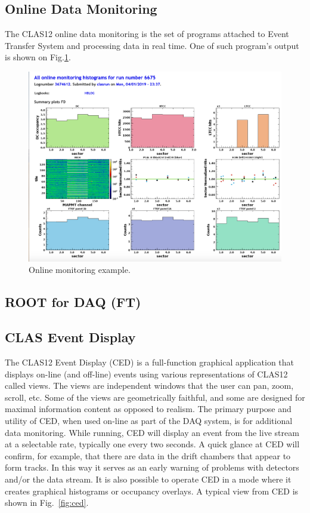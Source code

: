 \subsection{Online Data Monitoring}

The CLAS12 online data monitoring is the set of programs attached to Event Transfer System and processing data in real time. One of such program's output is shown on Fig.\ref{fig:online_monitor}.

\begin{figure}[hbt]
	\centering
	\includegraphics[width=1.0\columnwidth,keepaspectratio]{img/online_monitor.png}
	\caption{Online monitoring example.}
	\label{fig:online_monitor}
\end{figure}

\subsection{ROOT for DAQ (FT)}




\subsection{CLAS Event Display}

The CLAS12 Event Display (CED) is a full-function graphical application that displays on-line (and off-line) events using various representations of CLAS12 called views. The views are independent windows that the user can pan, zoom, scroll, etc. Some of the views are geometrically faithful, and some are designed for maximal information content as opposed to realism. The primary purpose and utility of CED, when used on-line as part of the DAQ system, is for additional data monitoring. While running, CED will display an event from the live stream at a selectable rate, typically one every two seconds. A quick glance at CED will confirm, for example, that there are data in the drift chambers that appear to form tracks. In this way it serves as an early warning of problems with detectors and/or the data stream. It is also possible to operate CED in a mode where it creates graphical histograms or occupancy overlays. A typical view from CED is shown in Fig.~\ref{fig:ced}.


